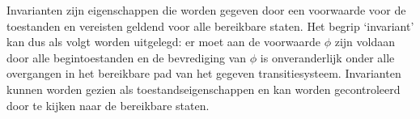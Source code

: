 \documentclass{article}
\begin{document}
Invarianten zijn eigenschappen die worden gegeven door een voorwaarde  voor de toestanden en vereisten geldend 	voor alle bereikbare staten.
	Het begrip ‘invariant’ kan dus als volgt worden uitgelegd: er moet aan de voorwaarde $\phi$ zijn voldaan 	door alle begintoestanden en de bevrediging van  $\phi$ is onveranderlijk onder alle overgangen in het bereikbare 	pad van het gegeven transitiesysteem.  Invarianten kunnen worden gezien als toestandseigenschappen en 	kan worden gecontroleerd door te kijken naar de bereikbare staten. 
	
\end{document}
